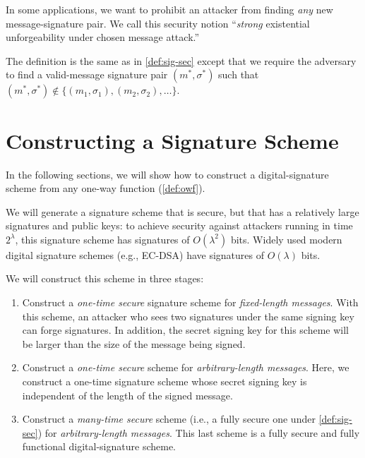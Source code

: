 In some applications, we want to prohibit an attacker from finding \emph{any}
new message-signature pair. We call this security notion ``\emph{strong} existential unforgeability under chosen message attack.'' 

The definition is the same as in \cref{def:sig-sec} except that we require
the adversary to find a valid-message signature pair $(m^*, \sigma^*)$
such that $(m^*, \sigma^*) \not \in \{ (m_1, \sigma_1), (m_2, \sigma_2), \dots \}$.

\section{Constructing a Signature Scheme}
In the following sections, we will show how to construct a digital-signature
scheme from any one-way function (\cref{def:owf}).

We will generate a signature scheme that is secure, but that has a relatively large
signatures and public keys: to achieve security against attackers running
in time $2^\lambda$, this signature scheme has signatures of $O(\lambda^2)$ bits.
Widely used modern digital signature schemes (e.g., EC-DSA) have signatures
of $O(\lambda)$ bits.

We will construct this scheme in three stages:

\begin{enumerate}
	\item Construct a \emph{one-time secure} signature scheme for \emph{fixed-length messages}.
        With this scheme, an attacker who sees two signatures under the same signing key can forge signatures.
        In addition, the secret signing key for this scheme will be larger than the size of the message 
        being signed.
      \item Construct a \emph{one-time secure} scheme for \emph{arbitrary-length messages}.
        Here, we construct a one-time signature scheme whose secret signing key is independent of 
        the length of the signed message.

      \item Construct a \emph{many-time secure} scheme (i.e., a fully secure one under 
        \cref{def:sig-sec}) for \emph{arbitrary-length messages}.
        This last scheme is a fully secure and fully functional digital-signature scheme.
\end{enumerate}


